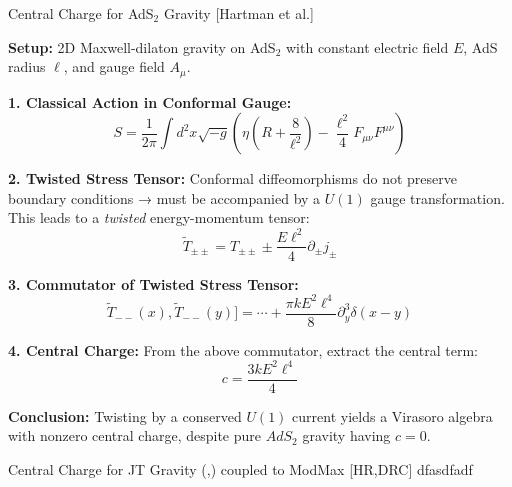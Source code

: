 \begin{frame}[allowframebreaks]{Central Charge for AdS\(_2\) Gravity {\color{red}\scriptsize [Hartman et al.]\cite{Hartman:2008dq}}}
    
\textbf{Setup:} 2D Maxwell-dilaton gravity on AdS\(_2\) with constant electric field \( E \), AdS radius \( \ell \), and gauge field \( A_\mu \).  

\bigskip

\textbf{1. Classical Action in Conformal Gauge:}
\[S = \frac{1}{2\pi} \int d^2x \sqrt{-g} \left( \eta \left(R + \frac{8}{\ell^2} \right) - \frac{\ell^2}{4} F_{\mu\nu}F^{\mu\nu} \right)\]

\textbf{2. Twisted Stress Tensor:}  
Conformal diffeomorphisms do not preserve boundary conditions → must be accompanied by a \( U(1) \) gauge transformation.  
This leads to a \emph{twisted} energy-momentum tensor:
\[\widetilde{T}_{\pm\pm} = T_{\pm\pm} \pm \frac{E \ell^2}{4} \partial_\pm j_\pm\]

\textbf{3. Commutator of Twisted Stress Tensor:}
\[\widetilde{T}_{--}(x), \widetilde{T}_{--}(y)] = \cdots + \frac{\pi k E^2 \ell^4}{8} \partial_y^3 \delta(x - y)\]


\textbf{4. Central Charge:}
From the above commutator, extract the central term:
\[c = \frac{3k E^2 \ell^4}{4}\]

\textbf{Conclusion:}  
Twisting by a conserved \( U(1) \) current yields a Virasoro algebra with nonzero central charge, despite pure \(AdS_2\) gravity having \( c = 0 \).
\end{frame}

\begin{frame}[allowframebreaks]{Central Charge for JT Gravity (\cite{jackiw1985lower},\cite{teitelboim1983gravitation}) coupled to ModMax {\color{red}\scriptsize [HR,DRC]\cite{rathi2023ads2}}}
dfasdfadf

\end{frame}


